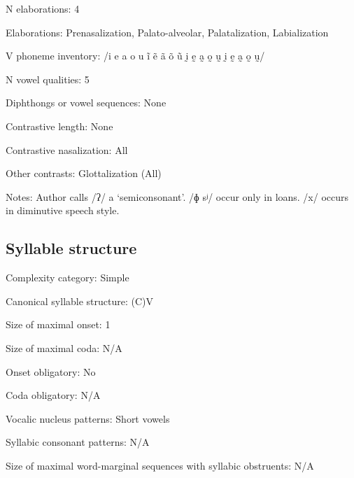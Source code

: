 {\begin{appendixdesc}
\item[N elaborations:] 4

\item[Elaborations:] Prenasalization, Palato-alveolar, Palatalization, Labialization

\item[V phoneme inventory:] /i e a o u ĩ ẽ ã õ ũ ḭ ḛ a̰ o̰ ṵ ḭ ḛ a̰ o̰ ṵ/

\item[N vowel qualities:] 5

\item[Diphthongs or vowel sequences:] None

\item[Contrastive length:] None

\item[Contrastive nasalization:] All

\item[Other contrasts:] Glottalization (All)

\item[Notes:] Author calls /ʔ/ a ‘semiconsonant’. /ɸ sʲ/ occur only in  loans. /x/ occurs in diminutive speech style.
\end{appendixdesc}
\subsection*{Syllable structure}
\begin{appendixdesc}

\item[Complexity category:] Simple

\item[Canonical syllable structure:] (C)V \citep[14]{Bradley1970}

\item[Size of maximal onset:] 1

\item[Size of maximal coda:] N/A

\item[Onset obligatory:] No

\item[Coda obligatory:] N/A

\item[Vocalic nucleus patterns:] Short vowels

\item[Syllabic consonant patterns:] N/A

\item[Size of maximal word-marginal sequences with syllabic obstruents:] N/A


\end{appendixdesc}}
